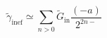 \documentclass[12pt]{article}
\begin{document}
\begin{displaymath}
\tilde { \gamma } _ { \mathrm { i n e f } } \simeq \sum _ { n > 0 } \tilde { G } _ { \mathrm { i n } } \frac { ( - a ) } { 2 ^ { 2 n - } }
\end{displaymath}
\end{document}
